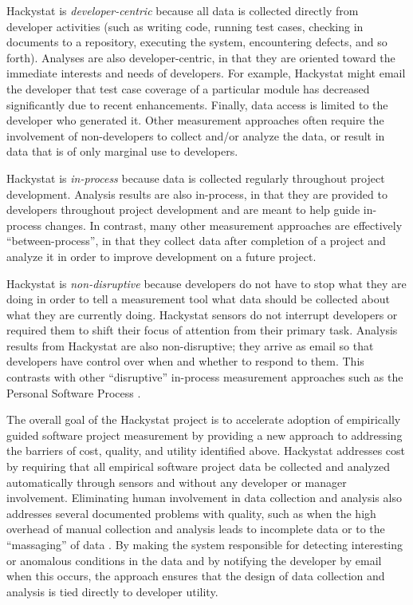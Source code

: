 Hackystat is {\em developer-centric} because all data is collected directly
from developer activities (such as writing code, running test cases,
checking in documents to a repository, executing the system, encountering
defects, and so forth).  Analyses are also developer-centric, in that they
are oriented toward the immediate interests and needs of developers. For
example, Hackystat might email the developer that test case coverage of a
particular module has decreased significantly due to recent enhancements.
Finally, data access is limited to the developer who generated it.  Other
measurement approaches often require the involvement of non-developers to
collect and/or analyze the data, or result in data that is of only marginal
use to developers.

Hackystat is {\em in-process} because data is collected regularly
throughout project development.  Analysis results are also in-process, in
that they are provided to developers throughout project development and are
meant to help guide in-process changes.  In contrast, many other
measurement approaches are effectively ``between-process'', in that they
collect data after completion of a project and analyze it in order to
improve development on a future project.

Hackystat is {\em non-disruptive} because developers do not have to stop
what they are doing in order to tell a measurement tool what data should be
collected about what they are currently doing.  Hackystat sensors do not
interrupt developers or required them to shift their focus of attention
from their primary task.  Analysis results from Hackystat are also
non-disruptive; they arrive as email so that developers have control over
when and whether to respond to them.  This contrasts with other
``disruptive'' in-process measurement approaches such as the Personal
Software Process \cite{Humphrey95}.

The overall goal of the Hackystat project is to accelerate adoption of
empirically guided software project measurement by providing a new approach
to addressing the barriers of cost, quality, and utility identified above.
Hackystat addresses cost by requiring that all empirical software project
data be collected and analyzed automatically through sensors and without
any developer or manager involvement.  Eliminating human involvement in
data collection and analysis also addresses several documented problems
with quality, such as when the high overhead of manual collection and
analysis leads to incomplete data \cite{csdl-98-13} or to the ``massaging''
of data \cite{Hall97}.  By making the system responsible for detecting
interesting or anomalous conditions in the data and by notifying the developer
by email when this occurs, the approach ensures that the design of data
collection and analysis is tied directly to developer utility.  

